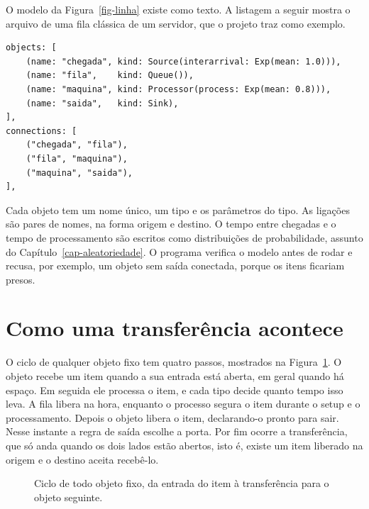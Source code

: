 O modelo da Figura~\ref{fig-linha} existe como texto. A listagem a seguir mostra o arquivo de uma fila clássica de um servidor, que o projeto traz como exemplo.

\begin{lstlisting}[language={}]
objects: [
    (name: "chegada", kind: Source(interarrival: Exp(mean: 1.0))),
    (name: "fila",    kind: Queue()),
    (name: "maquina", kind: Processor(process: Exp(mean: 0.8))),
    (name: "saida",   kind: Sink),
],
connections: [
    ("chegada", "fila"),
    ("fila", "maquina"),
    ("maquina", "saida"),
],
\end{lstlisting}

Cada objeto tem um nome único, um tipo e os parâmetros do tipo. As ligações são pares de nomes, na forma origem e destino. O tempo entre chegadas e o tempo de processamento são escritos como distribuições de probabilidade, assunto do Capítulo~\ref{cap-aleatoriedade}. O programa verifica o modelo antes de rodar e recusa, por exemplo, um objeto sem saída conectada, porque os itens ficariam presos.

\section{Como uma transferência acontece}

O ciclo de qualquer objeto fixo tem quatro passos, mostrados na Figura~\ref{fig-ciclo-objeto}. O objeto recebe um item quando a sua entrada está aberta, em geral quando há espaço. Em seguida ele processa o item, e cada tipo decide quanto tempo isso leva. A fila libera na hora, enquanto o processo segura o item durante o setup e o processamento. Depois o objeto libera o item, declarando-o pronto para sair. Nesse instante a regra de saída escolhe a porta. Por fim ocorre a transferência, que só anda quando os dois lados estão abertos, isto é, existe um item liberado na origem e o destino aceita recebê-lo.

\begin{figure}[ht]
\centering
{}
\caption{Ciclo de todo objeto fixo, da entrada do item à transferência para o objeto seguinte.}
\label{fig-ciclo-objeto}
\end{figure}

